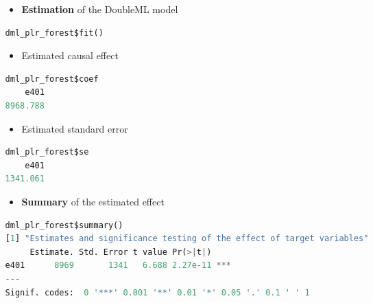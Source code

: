 \begin{frame}[fragile]
\begin{columns}
\begin{column}{0.3\textwidth}
\end{column}
\begin{column}{0.7\textwidth}
\begin{itemize}
\item \textbf{Estimation} of the DoubleML model
\end{itemize}
{\tiny
\begin{lstlisting}[language=Python,
backgroundcolor = \color{gray!20},
keywordstyle=\color{OliveGreen}, stringstyle=\color{BrickRed}]
dml_plr_forest$fit()
\end{lstlisting}
}
\begin{itemize}
\item Estimated causal effect
\end{itemize}
{\tiny
\begin{lstlisting}[language=Python,
backgroundcolor = \color{gray!20},
keywordstyle=\color{OliveGreen}, stringstyle=\color{BrickRed}]
dml_plr_forest$coef
    e401 
8968.788
\end{lstlisting}
}
\begin{itemize}
\item Estimated standard error
\end{itemize}
{\tiny
\begin{lstlisting}[language=Python,
backgroundcolor = \color{gray!20},
keywordstyle=\color{OliveGreen}, stringstyle=\color{BrickRed}]
dml_plr_forest$se
    e401 
1341.061 
\end{lstlisting}
}
\begin{itemize}
\item \textbf{Summary} of the estimated effect
\end{itemize}
{\tiny
\begin{lstlisting}[language=Python,
backgroundcolor = \color{gray!20},
keywordstyle=\color{OliveGreen}, stringstyle=\color{BrickRed}]
dml_plr_forest$summary()
[1] "Estimates and significance testing of the effect of target variables"
     Estimate. Std. Error t value Pr(>|t|)    
e401      8969       1341   6.688 2.27e-11 ***
---
Signif. codes:  0 '***' 0.001 '**' 0.01 '*' 0.05 '.' 0.1 ' ' 1
\end{lstlisting}
}
\end{column}
\end{columns}
\end{frame}

